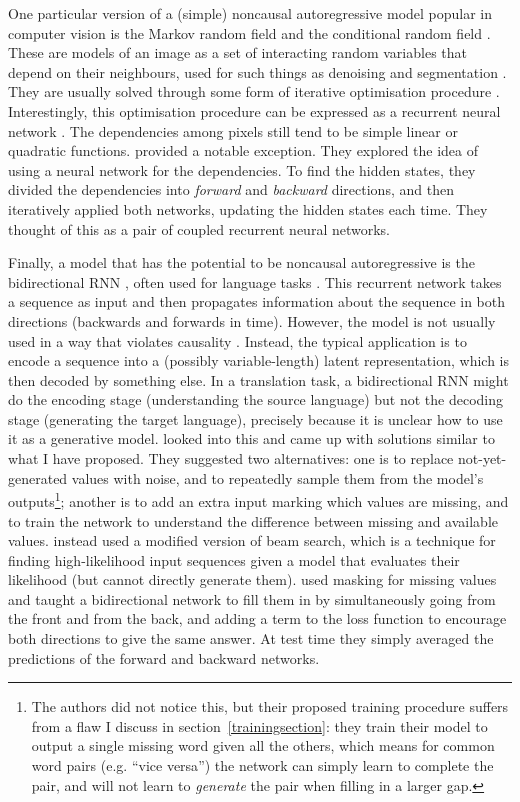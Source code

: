 \documentclass[11pt, a4paper, openany]{book}
\newcommand{\nquote}[1]{``{#1}''}
\begin{document}
One particular version of a (simple) noncausal autoregressive model popular in computer vision is the Markov random field \citep{mrf1,mrf2} and the conditional random field \citep{crf1,crf2}. These are models of an image as a set of interacting random variables that depend on their neighbours, used for such things as denoising and segmentation \citep{mrfuse1,mrfuse2}. They are usually solved through some form of iterative optimisation procedure \citep{mrflearning1,mrflearning2}. Interestingly, this optimisation procedure can be expressed as a recurrent neural network \citep{crfrcnn}. The dependencies among pixels still tend to be simple linear or quadratic functions. \citet{deepmrf} provided a notable exception. They explored the idea of using a neural network for the dependencies. To find the hidden states, they divided the dependencies into \emph{forward} and \emph{backward} directions, and then iteratively applied both networks, updating the hidden states each time. They thought of this as a pair of coupled recurrent neural networks.

Finally, a model that has the potential to be noncausal autoregressive is the bidirectional RNN \citep{brnn1,brnn2}, often used for language tasks \citep{brnnuse1,brnnuse2,brnnuse3}. This recurrent network takes a sequence as input and then propagates information about the sequence in both directions (backwards and forwards in time). However, the model is not usually used in a way that violates causality \citep{brnndenoise}. Instead, the typical application is to encode a sequence into a (possibly variable-length) latent representation, which is then decoded by something else. In a translation task, a bidirectional RNN might do the encoding stage (understanding the source language) but not the decoding stage (generating the target language), precisely because it is unclear how to use it as a generative model. \citet{brnndenoise} looked into this and came up with solutions similar to what I have proposed. They suggested two alternatives: one is to replace not-yet-generated values with noise, and to repeatedly sample them from the model's outputs\footnote{The authors did not notice this, but their proposed training procedure suffers from a flaw I discuss in section~\ref{trainingsection}: they train their model to output a single missing word given all the others, which means for common word pairs (e.g. \nquote{vice versa}) the network can simply learn to complete the pair, and will not learn to \emph{generate} the pair when filling in a larger gap.}; another is to add an extra input marking which values are missing, and to train the network to understand the difference between missing and available values. \citet{brnnsearch} instead used a modified version of beam search, which is a technique for finding high-likelihood input sequences given a model that evaluates their likelihood (but cannot directly generate them). \cite{brits} used masking for missing values and taught a bidirectional network to fill them in by simultaneously going from the front and from the back, and adding a term to the loss function to encourage both directions to give the same answer. At test time they simply averaged the predictions of the forward and backward networks.
\end{document}
